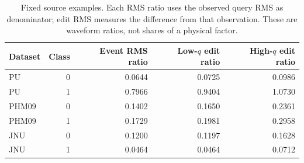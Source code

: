 \begin{table}[pos=htbp]
\centering\small
\caption{Fixed source examples. Each RMS ratio uses the observed query RMS as denominator; edit RMS measures the difference from that observation. These are waveform ratios, not shares of a physical factor.}
\label{tab:source-values}
\begin{tabular}{lrrrr}
\toprule
Dataset & Class & Event RMS ratio & Low-$q$ edit ratio & High-$q$ edit ratio\\
\midrule
PU & 0 & 0.0644 & 0.0725 & 0.0986\\
PU & 1 & 0.7966 & 0.9404 & 1.0730\\
PHM09 & 0 & 0.1402 & 0.1650 & 0.2361\\
PHM09 & 1 & 0.1729 & 0.1981 & 0.2958\\
JNU & 0 & 0.1200 & 0.1197 & 0.1628\\
JNU & 1 & 0.0464 & 0.0464 & 0.0712\\
\bottomrule
\end{tabular}
\end{table}
